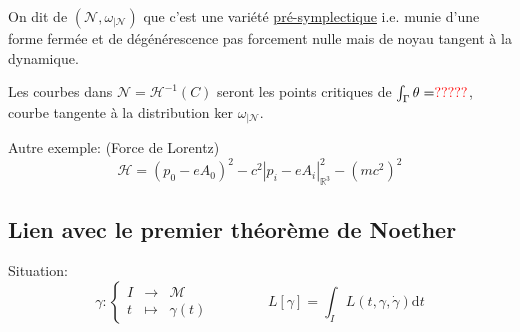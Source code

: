 \documentclass[a4paper,11pt]{article}
\renewcommand{\d}{{\mathrm{d}}}
\begin{document}
On dit de $\left(\mathcal{N},\omega_{|\mathcal{N}}\right)$ que c'est une variété \underline{pré-symplectique} i.e. munie d'une forme fermée et de dégénérescence pas forcement nulle mais de noyau tangent à la dynamique.

Les courbes dans $\mathcal{N}= \mathcal{H}^{-1}(C)$ seront les points critiques de $\int_\Gamma \theta = \color{red} ?????\color{black}$, courbe tangente à la distribution ker $\omega_{|\mathcal{N}}$.

\noindent Autre exemple: (Force de Lorentz)
$$\mathcal{H} = (p_0 - eA_0)^2 - c^2|p_i-eA_i|^2_{\mathbb{R}^3} - (mc^2)^2$$

\subsection{Lien avec le premier théorème de Noether}
Situation:
$$\gamma : \left\{ \begin{matrix}
I & \to & \mathcal{M}\\
t & \mapsto & \gamma(t)
\end{matrix}\right.
\quad \quad \quad \quad
L[\gamma]=\int_I L(t,\gamma,\dot\gamma)\d t$$
\end{document}

